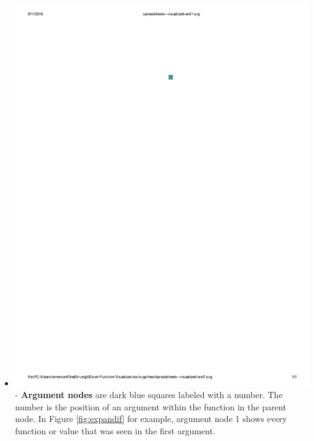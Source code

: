 \documentclass[conference]{IEEEtran}
\begin{document}
\begin{itemize}
		\item  \vspace{.25cm} \includegraphics{glossary-blue} - \textbf{Argument
			nodes} are dark blue squares labeled with a number. The number is the position
		of an argument within the function in the parent node. In Figure
		\ref{fig:expandif} for example, argument node 1 shows every function or value
		that was seen in the first argument.
		

\end{itemize}
\end{document}

